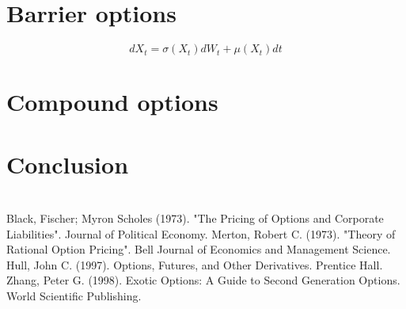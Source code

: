 \documentclass{article}
\begin{document}
\section{Barrier options
}


\[
dX_t=\sigma(X_t)dW_t + \mu(X_t) dt
\]


\section{Compound options
}


\section{Conclusion}


\newpage
\section*{} \label{bibsection}


\begin{thebibliography}{MMMMM} 
 Black, Fischer; Myron Scholes (1973). "The Pricing of Options and Corporate Liabilities". Journal of Political Economy.
 Merton, Robert C. (1973). "Theory of Rational Option Pricing". Bell Journal of Economics and Management Science.
 Hull, John C. (1997). Options, Futures, and Other Derivatives. Prentice Hall.
 Zhang, Peter G. (1998). Exotic Options: A Guide to Second Generation Options. World Scientific Publishing.

\end{thebibliography}


\end{document}
